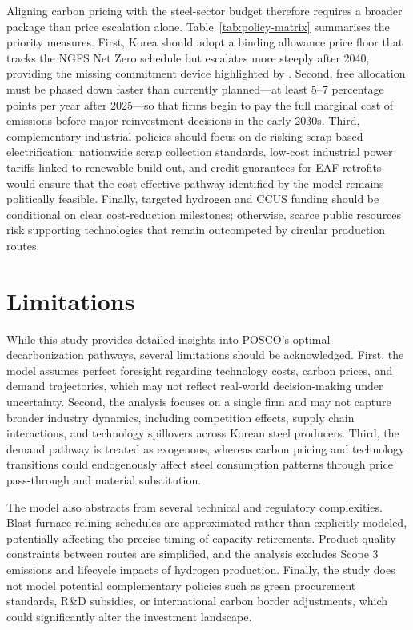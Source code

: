 \documentclass[preprint,1p,authoryear]{elsarticle}
\begin{document}
Aligning carbon pricing with the steel-sector budget therefore requires a broader package than price escalation alone. Table~\ref{tab:policy-matrix} summarises the priority measures. First, Korea should adopt a binding allowance price floor that tracks the NGFS Net Zero schedule but escalates more steeply after 2040, providing the missing commitment device highlighted by \citet{fowlie2016carbon}. Second, free allocation must be phased down faster than currently planned—at least 5--7 percentage points per year after 2025—so that firms begin to pay the full marginal cost of emissions before major reinvestment decisions in the early 2030s. Third, complementary industrial policies should focus on de-risking scrap-based electrification: nationwide scrap collection standards, low-cost industrial power tariffs linked to renewable build-out, and credit guarantees for EAF retrofits would ensure that the cost-effective pathway identified by the model remains politically feasible. Finally, targeted hydrogen and CCUS funding should be conditional on clear cost-reduction milestones; otherwise, scarce public resources risk supporting technologies that remain outcompeted by circular production routes.

\section{Limitations}

While this study provides detailed insights into POSCO's optimal decarbonization pathways, several limitations should be acknowledged. First, the model assumes perfect foresight regarding technology costs, carbon prices, and demand trajectories, which may not reflect real-world decision-making under uncertainty. Second, the analysis focuses on a single firm and may not capture broader industry dynamics, including competition effects, supply chain interactions, and technology spillovers across Korean steel producers. Third, the demand pathway is treated as exogenous, whereas carbon pricing and technology transitions could endogenously affect steel consumption patterns through price pass-through and material substitution.

The model also abstracts from several technical and regulatory complexities. Blast furnace relining schedules are approximated rather than explicitly modeled, potentially affecting the precise timing of capacity retirements. Product quality constraints between routes are simplified, and the analysis excludes Scope 3 emissions and lifecycle impacts of hydrogen production. Finally, the study does not model potential complementary policies such as green procurement standards, R\&D subsidies, or international carbon border adjustments, which could significantly alter the investment landscape.
\end{document}
